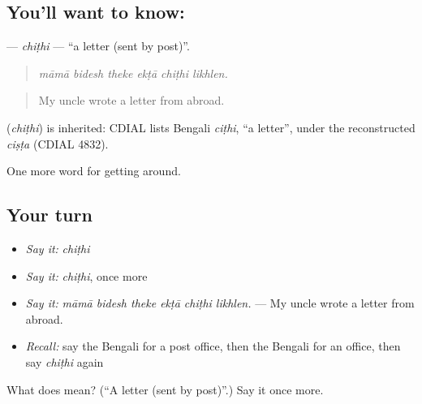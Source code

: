 \subsection*{You'll want to know: }
\textbf{} — \emph{chiṭhi} — \textquotedblleft{}a letter (sent by post)\textquotedblright{}.

\begin{quote}
     
\end{quote}

\begin{quote}
\emph{māmā bidesh theke ekṭā chiṭhi likhlen.}
\end{quote}

\begin{quote}
My uncle wrote a letter from abroad.
\end{quote}

\begin{cousinweb}
\textbf{} (\emph{chiṭhi}) is inherited: CDIAL lists Bengali \emph{ciṭhi}, \textquotedblleft{}a letter\textquotedblright{}, under the reconstructed \emph{ciṣṭa} (CDIAL 4832).
\end{cousinweb}

\begin{grammarlens}[title={What you've built}]
One more word for getting around.
\end{grammarlens}

\subsection*{Your turn}
\begin{itemize}
\raggedright
  \item \emph{Say it:} \emph{chiṭhi}
  \item \emph{Say it:} \emph{chiṭhi}, once more
  \item \emph{Say it:} \emph{māmā bidesh theke ekṭā chiṭhi likhlen.} — My uncle wrote a letter from abroad.
  \item \emph{Recall:} say the Bengali for a post office, then the Bengali for an office, then say \emph{chiṭhi} again
\end{itemize}

\begin{tcolorbox}[breakable,colback=teal!4,colframe=teal!35!black,title={Before you move on}]
What does  mean? (\textquotedblleft{}A letter (sent by post)\textquotedblright{}.) Say it once more.
\end{tcolorbox}
